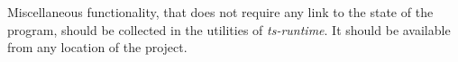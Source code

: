 Miscellaneous functionality, that does not require any link to the state of the program, should be collected in the utilities of \emph{ts-runtime}. It should be available from any location of the project.



